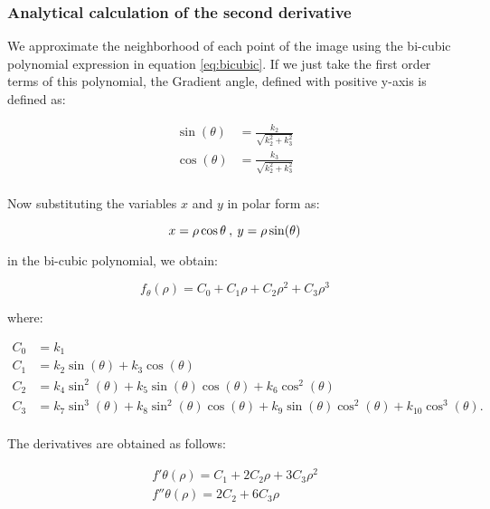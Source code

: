 \documentclass{ipol}
\numberwithin{equation}{section}
\numberwithin{table}{section}
\begin{document}
\subsubsection{Analytical calculation of the second derivative}
\label{sec:secderivative}

We approximate the neighborhood of each point of the image using the bi-cubic polynomial 
expression in equation \ref{eq:bicubic}. If we just take the first order terms of this 
polynomial, the Gradient angle, defined with positive y-axis is defined as:

\begin{align}
\label{eq:sincos}
	\sin(\theta) & = \frac{k_2}{\sqrt{k_2^2 + k_3^2}} \nonumber \\
	\cos(\theta) & = \frac{k_3}{\sqrt{k_2^2 + k_3^2}} \nonumber \\
\end{align}

Now substituting the variables $x$ and $y$ in polar form as:

\begin{equation*}
	x = \rho\cos{\theta} \: , \: y = \rho\sin(\theta) \\
\end{equation*}

in the bi-cubic polynomial, we obtain:

\begin{equation}
	f_{\theta}(\rho) = C_0 + C_1\rho + C_2\rho^2 + C_3\rho^3
\end{equation}

where:

\begin{align}
\label{eq:c}
	C_0 & = k_1 \nonumber \nonumber \\
	C_1 & = k_2\sin(\theta) + k_3\cos(\theta) \nonumber \\
	C_2 & = k_4\sin^2(\theta) + k_5\sin(\theta)\cos(\theta) + k_6\cos^2(\theta) \nonumber \\
	C_3 & = k_7\sin^3(\theta) + k_8\sin^2(\theta)\cos(\theta) + k_9\sin(\theta)\cos^2(\theta) + k_{10}\cos^3(\theta). \nonumber \\
\end{align}

The derivatives are obtained as follows:

\begin{align}
	f'{\theta}(\rho) = C_1 + 2C_2\rho + 3C_3\rho^2 \nonumber \\
	f''{\theta}(\rho) = 2C_2 + 6C_3\rho \nonumber \\
\end{align}
\end{document}
